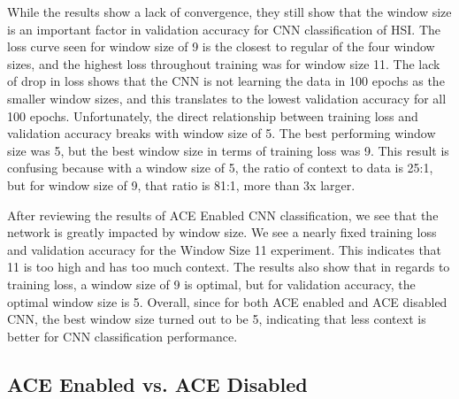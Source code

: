 \documentclass[12pt]{article}
\begin{document}
While the results show a lack of convergence, they still show that the window size is an important factor in validation accuracy for CNN classification of HSI.
%
The loss curve seen for window size of 9 is the closest to regular of the four window sizes, and the highest loss throughout training was for window size 11.
%
The lack of drop in loss shows that the CNN is not learning the data in 100 epochs as the smaller window sizes, and this translates to the lowest validation accuracy for all 100 epochs.
%
Unfortunately, the direct relationship between training loss and validation accuracy breaks with window size of 5.
%
The best performing window size was 5, but the best window size in terms of training loss was 9. 
%
This result is confusing because with a window size of 5, the ratio of context to data is 25:1, but for window size of 9, that ratio is 81:1, more than 3x larger.

After reviewing the results of ACE Enabled CNN classification, we see that the network is greatly impacted by window size.
%
We see a nearly fixed training loss and validation accuracy for the Window Size 11 experiment. 
%
This indicates that 11 is too high and has too much context.
%
The results also show that in regards to training loss, a window size of 9 is optimal, but for validation accuracy, the optimal window size is 5.
%
Overall, since for both ACE enabled and ACE disabled CNN, the best window size turned out to be 5, indicating that less context is better for CNN classification performance.


\subsection{ACE Enabled vs. ACE Disabled}
\end{document}
